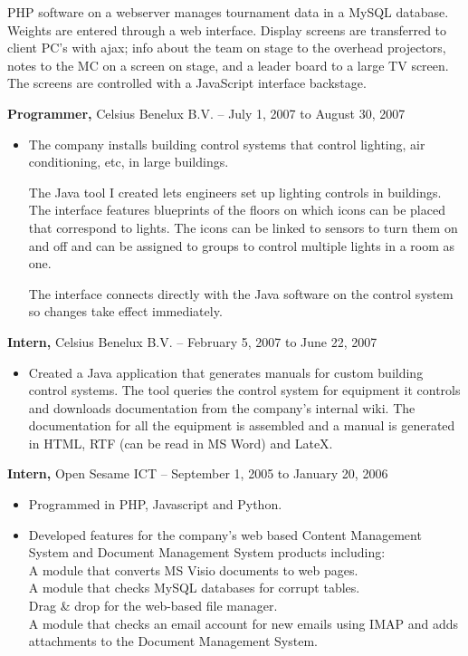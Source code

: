 \documentclass{res}
\begin{document}
\begin{resume}
\begin{itemize}
    PHP software on a webserver manages tournament data in a MySQL
    database. Weights are entered through a web interface. Display
    screens are transferred to client PC's with ajax; info about the
    team on stage to the overhead projectors, notes to the MC on a
    screen on stage, and a leader board to a large TV screen. The
    screens are controlled with a JavaScript interface backstage.
\end{itemize}

{\bf Programmer,} Celsius Benelux B.V. -- July 1, 2007 to August 30, 2007
\begin{itemize} \itemsep -2pt
\item The company installs building control systems that control
  lighting, air conditioning, etc, in large buildings.

  The Java tool I created lets engineers set up lighting controls in
  buildings. The interface features blueprints of the floors on which
  icons can be placed that correspond to lights. The icons can be
  linked to sensors to turn them on and off and can be assigned to
  groups to control multiple lights in a room as one.

  The interface connects directly with the Java software on the
  control system so changes take effect immediately.
\end{itemize}

{\bf Intern,} Celsius Benelux B.V. -- February 5, 2007 to June 22, 2007
\begin{itemize} \itemsep -2pt
\item Created a Java application that generates manuals for
  custom building control systems. The tool queries the control system
  for equipment it controls and downloads documentation from the
  company's internal wiki. The documentation for all the equipment is
  assembled and a manual is generated in HTML, RTF (can be read in MS
  Word) and LateX.
\end{itemize}

{\bf Intern,} Open Sesame ICT -- September 1, 2005 to January 20, 2006
\begin{itemize} \itemsep -2pt
\item Programmed in PHP, Javascript and Python.
\item Developed features for the company's web based Content Management
  System and Document Management System products including: \\
  A module that converts MS Visio documents to web pages. \\
  A module that checks MySQL databases for corrupt tables. \\
  Drag \& drop for the web-based file manager. \\
  A module that checks an email account for new emails using IMAP
  and adds attachments to the Document Management System.
\end{itemize}


\end{resume}
\end{document}
